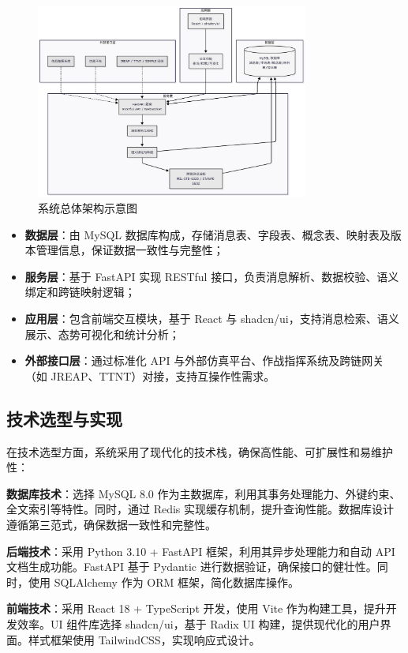 \begin{figure}[H]
    \centering
    \includegraphics[width=0.8\textwidth,height=0.33\textheight,keepaspectratio]{chapters/fig-0/sys-arch.png}
    \caption{系统总体架构示意图}
    \label{fig_sys_arch}
\end{figure}
\begin{itemize}
  \item \textbf{数据层}：由 MySQL 数据库构成，存储消息表、字段表、概念表、映射表及版本管理信息，保证数据一致性与完整性；
  \item \textbf{服务层}：基于 FastAPI 实现 RESTful 接口，负责消息解析、数据校验、语义绑定和跨链映射逻辑；
  \item \textbf{应用层}：包含前端交互模块，基于 React 与 shadcn/ui，支持消息检索、语义展示、态势可视化和统计分析；
  \item \textbf{外部接口层}：通过标准化 API 与外部仿真平台、作战指挥系统及跨链网关（如 JREAP、TTNT）对接，支持互操作性需求。
\end{itemize}

\subsection{技术选型与实现}
在技术选型方面，系统采用了现代化的技术栈，确保高性能、可扩展性和易维护性：

\textbf{数据库技术}：选择 MySQL 8.0 作为主数据库，利用其事务处理能力、外键约束、全文索引等特性。同时，通过 Redis 实现缓存机制，提升查询性能。数据库设计遵循第三范式，确保数据一致性和完整性。

\textbf{后端技术}：采用 Python 3.10 + FastAPI 框架，利用其异步处理能力和自动 API 文档生成功能。FastAPI 基于 Pydantic 进行数据验证，确保接口的健壮性。同时，使用 SQLAlchemy 作为 ORM 框架，简化数据库操作。

\textbf{前端技术}：采用 React 18 + TypeScript 开发，使用 Vite 作为构建工具，提升开发效率。UI 组件库选择 shadcn/ui，基于 Radix UI 构建，提供现代化的用户界面。样式框架使用 TailwindCSS，实现响应式设计。

